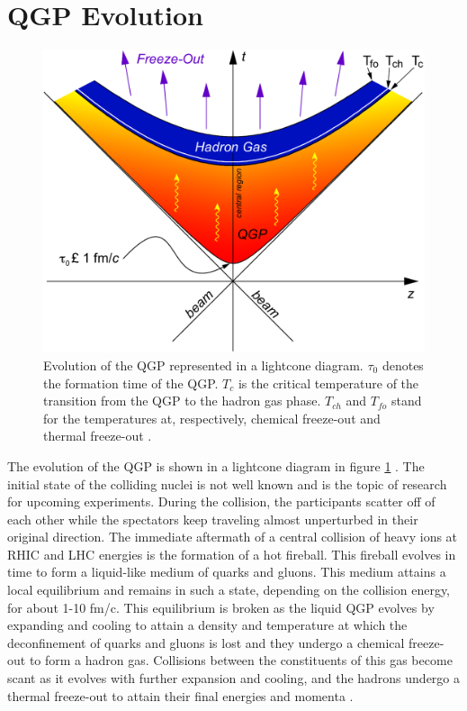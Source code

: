
\section{QGP Evolution}
\begin{figure}[h]
  \centering
  \includegraphics[width=5.5in]{figures/LightCone1_color-crop_NThesis.pdf}
  \caption{Evolution of the QGP represented in a lightcone diagram. $\tau_{0}$ denotes the formation time of the QGP. $T_{c}$ is the critical temperature of the transition from the QGP to the hadron gas phase. $T_{ch}$ and $T_{fo}$ stand for the temperatures at, respectively, chemical freeze-out and thermal freeze-out \cite{Connors:2017ptx}.}\label{fig:lightcone}
\end{figure}
The evolution of the QGP is shown in a lightcone diagram in figure \ref{fig:lightcone} \cite{Connors:2017ptx}. The initial state of the colliding nuclei is not well known and is the topic of research for upcoming experiments. During the collision, the participants scatter off of each other while the spectators keep traveling almost unperturbed in their original direction. The immediate aftermath of a central collision of heavy ions at RHIC and LHC energies is the formation of a hot fireball. This fireball evolves in time to form a liquid-like medium of quarks and gluons. This medium attains a local equilibrium and remains in such a state, depending on the collision energy, for about 1-10 fm/c. This equilibrium is broken as the liquid QGP evolves by expanding and cooling to attain a density and temperature at which the deconfinement of quarks and gluons is lost and they undergo a chemical freeze-out to form a hadron gas. Collisions between the constituents of this gas become scant as it evolves with further expansion and cooling, and the hadrons undergo a thermal freeze-out to attain their final energies and momenta \cite{Connors:2017ptx}.


